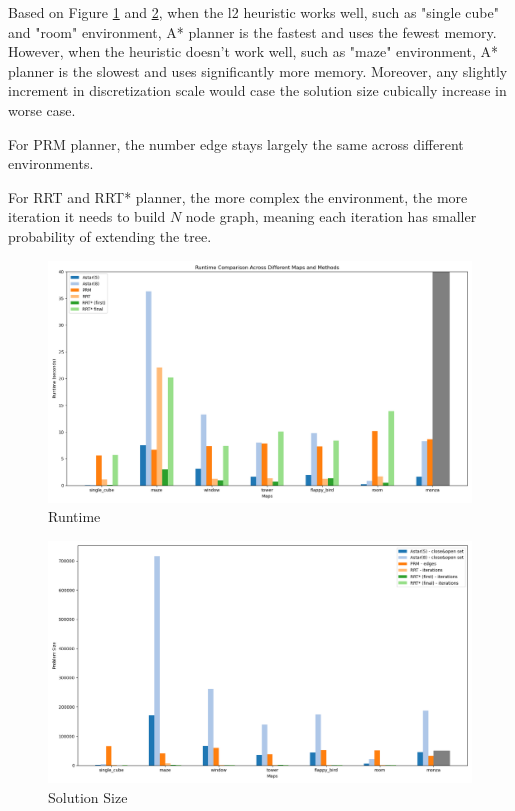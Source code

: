 \documentclass[conference]{IEEEtran}
\begin{document}
Based on Figure \ref{fig:runtime} and \ref{fig:sol-size},
when the l2 heuristic works well, such as "single cube" and "room" environment,
A* planner is the fastest and uses the fewest memory.
However, when the heuristic doesn't work well, such as "maze" environment,
A* planner is the slowest and uses significantly more memory. 
Moreover, any slightly increment in discretization scale would case the solution size cubically increase in worse case.

For PRM planner, the number edge stays largely the same 
across different environments.

For RRT and RRT* planner, the more complex the environment, 
the more iteration it needs to build $N$ node graph,
meaning each iteration has smaller probability of extending the tree.

\begin{figure}
    \centering
    \includegraphics[width=\linewidth]{img/runtime.png}
    \caption{Runtime}
    \label{fig:runtime}
\end{figure}

\begin{figure}
    \centering
    \includegraphics[width=\linewidth]{img/problem_size.png}
    \caption{Solution Size}
    \label{fig:sol-size}
\end{figure}
\end{document}
